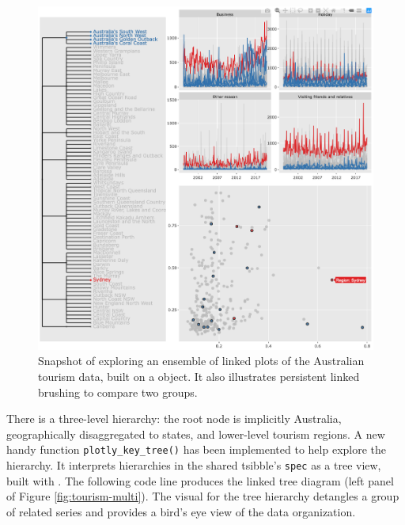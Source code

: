 \begin{Schunk}
\begin{figure}

{\centering \includegraphics[width=\textwidth]{img/tourism-linking} 

}

\caption[Snapshot of exploring an ensemble of linked plots of the Australian tourism data, built on a  object]{Snapshot of exploring an ensemble of linked plots of the Australian tourism data, built on a  object. It also illustrates persistent linked brushing to compare two groups.}\label{fig:tourism-linking-fig}
\end{figure}
\end{Schunk}

\noindent There is a three-level hierarchy: the root node is implicitly
Australia, geographically disaggregated to states, and lower-level
tourism regions. A new handy function \texttt{plotly\_key\_tree()} has
been implemented to help explore the hierarchy. It interprets
hierarchies in the shared tsibble's \texttt{spec} as a tree view, built
with . The following code line produces the linked tree
diagram (left panel of Figure \ref{fig:tourism-multi}). The visual for
the tree hierarchy detangles a group of related series and provides a
bird's eye view of the data organization.

